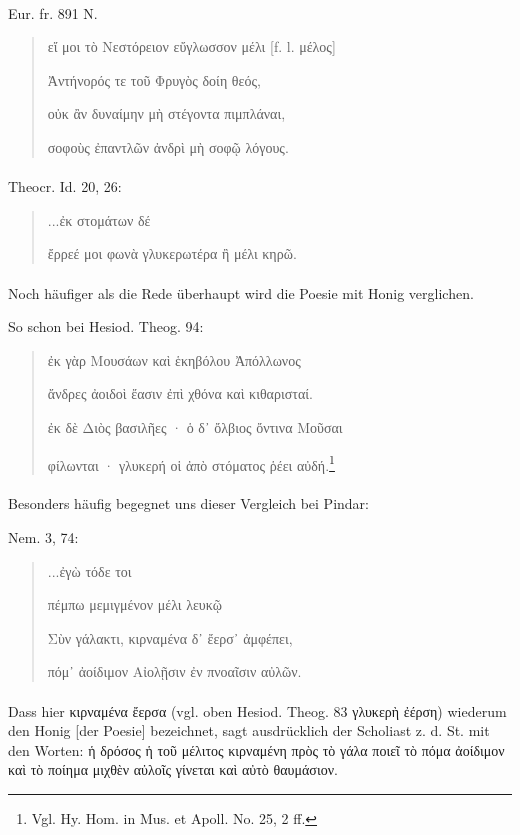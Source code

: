 \documentclass[a4paper, 11pt, oneside]{article}
\begin{document}
\paragraph{}
Eur. fr. 891 N.
\begin{quotation}\large
εἴ μοι τὸ Νεστόρειον εὔγλωσσον μέλι [f. l. μέλος]

Ἀντήνορός τε τοῦ Φρυγὸς δοίη θεός,

οὐκ ἂν δυναίμην μὴ στέγοντα πιμπλάναι,

σοφοὺς ἐπαντλῶν ἀνδρὶ μὴ σοφῷ λόγους.
\end{quotation}
\paragraph{}
Theocr. Id. 20, 26:
\begin{quotation}\large
\hspace*{15mm}...ἐκ στομάτων δέ

ἔρρεέ μοι φωνὰ γλυκερωτέρα ἢ μέλι κηρῶ.
\end{quotation}
\paragraph{}
Noch häufiger als die Rede überhaupt wird die Poesie mit Honig verglichen.

So schon bei Hesiod. Theog. 94:
\begin{quotation}\large
ἐκ γὰρ Μουσάων καὶ ἑκηβόλου Ἀπόλλωνος

ἄνδρες ἀοιδοὶ ἔασιν ἐπὶ χθόνα καὶ κιθαρισταί.

ἐκ δὲ Διὸς βασιλῆες · ὁ δ᾽ ὄλβιος ὄντινα Μοῦσαι

φίλωνται · γλυκερή οἱ ἀπὸ στόματος ῥέει αὐδή.\footnote{Vgl. Hy. Hom. in Mus. et Apoll. No. 25, 2 ff.}
\end{quotation}
\paragraph{}
Besonders häufig begegnet uns dieser Vergleich bei Pindar:

Nem. 3, 74:
\begin{quotation}\large
\hspace*{15mm}...ἐγὼ τόδε τοι

πέμπω μεμιγμένον μέλι λευκῷ

Σὺν γάλακτι, κιρναμένα δ᾽ ἔερσ᾽ ἀμφέπει,

πόμ᾽ ἀοίδιμον Αἰολῇσιν ἐν πνοαῖσιν αὐλῶν.
\end{quotation}
\paragraph{}
Dass hier κιρναμένα ἔερσα (vgl. oben Hesiod. Theog. 83 γλυκερὴ ἐέρση) wiederum den Honig [der Poesie] bezeichnet, sagt ausdrücklich der Scholiast z. d. St. mit den Worten: ἡ δρόσος ἡ τοῦ μέλιτος κιρναμένη πρὸς τὸ γάλα ποιεῖ τὸ πόμα ἀοίδιμον καὶ τὸ ποίημα μιχθὲν αὐλοῖς γίνεται καὶ αὐτὸ θαυμάσιον.
\end{document}
